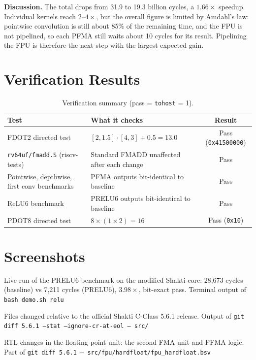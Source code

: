\textbf{Discussion.} The total drops from 31.9 to 19.3 billion cycles,
a $1.66\times$ speedup. Individual kernels reach $2$--$4\times$, but the
overall figure is limited by Amdahl's law: pointwise convolution is still
about 85\% of the remaining time, and the FPU is not pipelined, so each PFMA
still waits about 10 cycles for its result. Pipelining the FPU is therefore
the next step with the largest expected gain.

\section{Verification Results}

\begin{table}[h]
\centering
\begin{tabular}{p{5cm}p{6cm}c}\toprule
Test & What it checks & Result\\\midrule
FDOT2 directed test & $[2, 1.5]\cdot[4, 3] + 0.5 = 13.0$ & Pass (\texttt{0x41500000})\\
\texttt{rv64uf/fmadd.S} (riscv-tests) & Standard FMADD unaffected after each change & Pass\\
Pointwise, depthwise, first conv benchmarks & PFMA outputs bit-identical to baseline & Pass\\
ReLU6 benchmark & PRELU6 outputs bit-identical to baseline & Pass\\
PDOT8 directed test & $8 \times (1 \times 2) = 16$ & Pass (\texttt{0x10})\\\bottomrule
\end{tabular}
\caption{Verification summary (pass = \texttt{tohost} = 1).}
\end{table}

\section{Screenshots}

  {Live run of the PRELU6 benchmark on the modified Shakti core: 28,673 cycles
   (baseline) vs 7,211 cycles (PRELU6), $3.98\times$, bit-exact pass.}
  {Terminal output of \texttt{bash demo.sh relu}}

  {Files changed relative to the official Shakti C-Class 5.6.1 release.}
  {Output of \texttt{git diff 5.6.1 --stat --ignore-cr-at-eol -- src/}}

  {RTL changes in the floating-point unit: the second FMA unit and PFMA logic.}
  {Part of \texttt{git diff 5.6.1 -- src/fpu/hardfloat/fpu\_hardfloat.bsv}}

